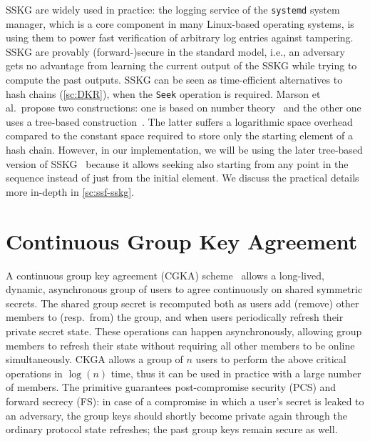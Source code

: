 SSKG are widely used in practice:
the logging service of the \texttt{systemd} system manager,
which is a core component in many Linux-based operating systems,
is using them to power fast verification of arbitrary log entries against tampering.
SSKG are provably (forward-)secure in the standard model, i.e.,
an adversary gets no advantage from learning the current output of the SSKG
while trying to compute the past outputs.
SSKG can be seen as time-efficient alternatives to hash chains (\cref{sc:DKR}),
when the \texttt{Seek} operation is required.
Marson et al.\ propose two constructions: one is based on number theory~\cite{ESORICS:MarPoe13}
and the other one uses a tree-based construction~\cite{ESORICS:MarPoe14}.
The latter suffers a logarithmic space overhead 
compared to the constant space required to store 
only the starting element of a hash chain.
However, in our implementation, we will be using the later tree-based version of SSKG~\cite{ESORICS:MarPoe14}
because it allows seeking also starting from any point in the sequence
instead of just from the initial element.
We discuss the practical details more in-depth in \cref{sc:ssf-sskg}.

\section{Continuous Group Key Agreement}\label{sc:CGKA}

A continuous group key agreement (CGKA) scheme~\cite{C:ACDT20}
allows a long-lived, dynamic, asynchronous group of users to agree 
continuously on shared symmetric secrets.
The shared group secret is recomputed both as users add (remove)
other members to (resp.\ from) the group, and when users periodically
refresh their private secret state. These operations can happen
asynchronously, allowing group members to refresh their 
state without requiring all other members to be online 
simultaneously.
CKGA allows a group of $n$ users to perform the above critical 
operations in $\log(n)$ time,
thus it can be used in practice with a large number of members.
The primitive guarantees post-compromise security (PCS) and forward secrecy (FS):
in case of a compromise in which a user's secret is leaked
to an adversary, the group keys should shortly become private
again through the ordinary protocol state refreshes; the past
group keys remain secure as well.

